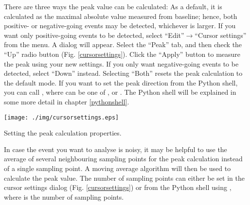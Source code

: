 There are three ways the peak value can be calculated: As a default, it is calculated as the maximal absolute value measured from baseline; hence, both positive- or negative-going events may be detected, whichever is larger. If you want only positive-going events to be detected,  select ``Edit''$\rightarrow$``Cursor settings'' from the menu. A dialog will appear. Select the ``Peak'' tab, and then check the ``Up'' radio button  (Fig. \ref{cursorsettings}). Click the ``Apply'' button to measure the peak using your new settings. If you only want negative-going events to be detected, select ``Down'' instead. Selecting ``Both'' resets the peak calculation to the default mode. If you want to set the peak direction from the Python shell, you can call , where  can be one of ,  or . The Python shell will be explained in some more detail in chapter \ref{pythonshell}.
  \begin{myfigure}[ht]
    \begin{center}
      \texttt{[image: ./img/cursorsettings.eps]}
    \end{center}
    \caption{Setting the peak calculation properties.}
    \label{cursorsettings}
  \end{myfigure}

In case the event you want to analyse is noisy, it may be helpful to use the average of several neighbouring sampling points for the peak calculation instead of a single sampling point. A moving average algorithm will then be used to calculate the peak value. The number of sampling points can either be set in the cursor settings dialog (Fig. \ref{cursorsettings}) or from the Python shell using , where  is the number of sampling points.

